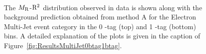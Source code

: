 \begin{figure}[!htb] \centering
{}\\
\caption{ The $M_\mathrm{R}$-$\mathrm{R}^2$ distribution observed in data is shown along with the background prediction
obtained from method A for the Electron Multi-Jet event category in
the 0 \PQb-tag (top) and 1 \PQb-tag (bottom) bins. A detailed explanation of the plots is given in the caption of
  Figure~\ref{fig:ResultsMultiJet0btag1btag}.
}
\label{fig:ResultsEleMultiJet0btag1btag}
\end{figure}


